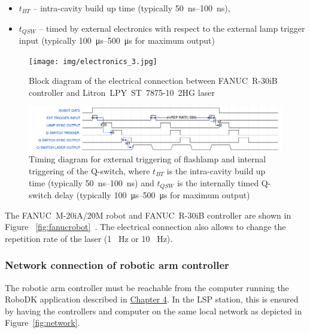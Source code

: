 \begin{itemize}
    \item $t_{BT}$ -- intra-cavity build up time (typically \SIrange{50}{100}{\ns}),
    \item $t_{QSW}$ -- timed by external electronics with respect to the external lamp trigger input (typically \SIrange{100}{500}{\us} for maximum output)

\end{itemize}


\begin{figure}[h]
    \centering
    \texttt{[image: img/electronics\_3.jpg]}
    \caption[Block diagram of the electrical connection]{Block diagram of the electrical connection between FANUC~R-30iB controller and Litron~LPY~ST~7875-10~2HG laser}
    \label{fig:electronics}
\end{figure}

\begin{figure}[h]
    \centering
    \includegraphics[width=1.0\linewidth]{img/wavedrom_bigger.png}
    \caption[Timing diagram for triggering of flashlamp and the Q-switch]{Timing diagram for external triggering of flashlamp and internal triggering of the Q-switch, where $t_{BT}$ is the intra-cavity build up time (typically \SIrange{50}{100}{\ns}) and $t_{QSW}$ is the internally timed Q-switch delay (typically \SIrange{100}{500}{\us} for maximum output)}
    \label{fig:wave}
\end{figure}

\noindent The  FANUC~M-20iA/20M robot and FANUC~R-30iB controller are shown in Figure~ \ref{fig:fanucrobot}~\cite{fanucrobotcontroller}. The electrical connection also allows to change the repetition rate of the laser (1 \SI{}{\hertz} or 10 \SI{}{\hertz}).

\subsubsection*{Network connection of robotic arm controller}


The robotic arm controller must be reachable from the computer running the RoboDK application described in \hyperref[chap:design]{Chapter 4}. In the LSP station, this is ensured by having the controllers and computer on the same local network as depicted in Figure~\ref{fig:network}. 

